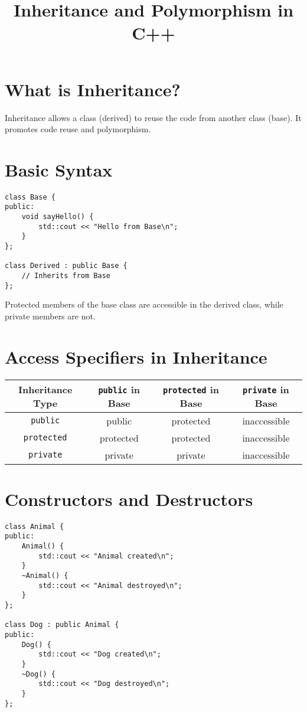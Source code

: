 \documentclass{article}
\title{Inheritance and  Polymorphism in C++}
\author{}
\date{}
\begin{document}
\maketitle

\section{What is Inheritance?}
Inheritance allows a class (derived) to reuse the code from another class (base). It promotes code reuse and polymorphism.

\section{Basic Syntax}
\begin{lstlisting}[style=cppstyle]
class Base {
public:
    void sayHello() {
        std::cout << "Hello from Base\n";
    }
};

class Derived : public Base {
    // Inherits from Base
};
\end{lstlisting}
Protected members of the base class are accessible in the derived class, while private members are not. \\

\section{Access Specifiers in Inheritance}
\begin{center}
\begin{tabular}{|c|c|c|c|}
\hline
Inheritance Type & \texttt{public} in Base & \texttt{protected} in Base & \texttt{private} in Base \\
\hline
\texttt{public}    & public     & protected  & inaccessible \\
\texttt{protected} & protected  & protected  & inaccessible \\
\texttt{private}   & private    & private    & inaccessible \\
\hline
\end{tabular}
\end{center}

\section{Constructors and Destructors}

\begin{lstlisting}[style=cppstyle]
class Animal {
public:
    Animal() {
        std::cout << "Animal created\n";
    }
    ~Animal() {
        std::cout << "Animal destroyed\n";
    }
};

class Dog : public Animal {
public:
    Dog() {
        std::cout << "Dog created\n";
    }
    ~Dog() {
        std::cout << "Dog destroyed\n";
    }
};
\end{lstlisting}
\end{document}
